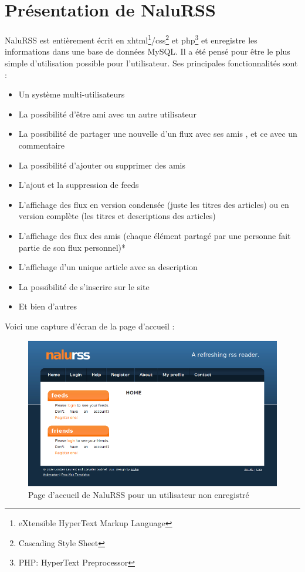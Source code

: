 \documentclass[11pt]{article}
\begin{document}
\section{Présentation de NaluRSS}
NaluRSS est entièrement écrit en xhtml\footnote{eXtensible HyperText Markup Language}/css\footnote{Cascading Style Sheet} et php\footnote{PHP: HyperText Preprocessor} et enregistre les informations dans une base de données MySQL. Il a été pensé pour être le plus simple d'utilisation possible pour l'utilisateur. Ses principales fonctionnalités sont :
\begin{itemize}
\item{Un système multi-utilisateurs}
\item{La possibilité d'être \og ami \fg avec un autre utilisateur}
\item{La possibilité de partager une nouvelle d'un flux avec ses \og amis \fg, et ce avec un commentaire}
\item{La possibilité d'ajouter ou supprimer des \og amis \fg}
\item{L'ajout et la suppression de feeds}
\item{L'affichage des flux en version condensée (juste les titres des articles) ou en version complète (les titres et descriptions des articles)}
\item{L'affichage des flux des \og amis \fg (chaque élément partagé par une personne fait partie de son flux personnel)}*
\item{L'affichage d'un unique article avec sa description}
\item{La possibilité de s'inscrire sur le site}
\item{Et bien d'autres}
\end{itemize}
Voici une capture d'écran de la page d'accueil :
\begin{figure}[!ht]
\begin{center}
\includegraphics[width=14cm]{home.png}
\end{center}
\caption{Page d'accueil de NaluRSS pour un utilisateur non enregistré}
\label{home}
\end{figure}
\newline
\end{document}
